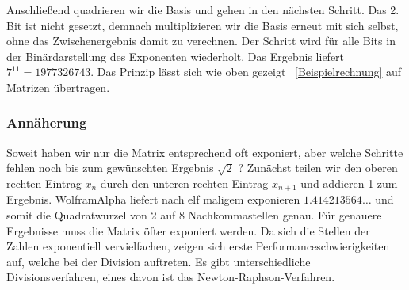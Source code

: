 \documentclass[course=erap]{aspdoc}
\begin{document}
    Anschließend quadrieren wir die Basis und gehen in den nächsten Schritt. Das 2. Bit ist nicht gesetzt, demnach multiplizieren wir die Basis erneut mit sich selbst, ohne das Zwischenergebnis damit zu verechnen. Der Schritt wird für alle Bits in der Binärdarstellung des Exponenten wiederholt. Das Ergebnis liefert \begin{math}
                                                                                                                                                                                                                                                                                                                                 7^{11} = 1977326743
    \end{math}. Das Prinzip lässt sich wie oben gezeigt ~\ref{Beispielrechnung} auf Matrizen übertragen.
    \subsubsection{Annäherung}
    Soweit haben wir nur die Matrix entsprechend oft exponiert, aber welche Schritte fehlen noch bis zum gewünschten Ergebnis \begin{math}
                                                                                                                                  \sqrt{2}
    \end{math} ? Zunächst teilen wir den oberen rechten Eintrag \begin{math}
                                                                    x_n
    \end{math} durch den unteren rechten Eintrag \begin{math}
                                                     x_{n+1}
    \end{math} und addieren 1 zum Ergebnis. WolframAlpha liefert nach elf maligem exponieren \begin{math}
                                                                                                 1.414213564\ldots
    \end{math} und somit die Quadratwurzel von 2 auf 8 Nachkommastellen genau. Für genauere Ergebnisse muss die Matrix öfter exponiert werden. Da sich die Stellen der Zahlen exponentiell vervielfachen, zeigen sich erste Performanceschwierigkeiten auf, welche bei der Division auftreten. Es gibt unterschiedliche Divisionsverfahren, eines davon ist das Newton-Raphson-Verfahren.
\end{document}
